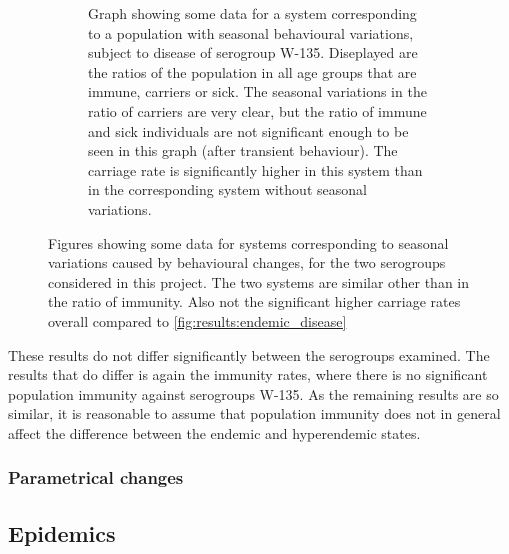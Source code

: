\documentclass[10pt,a4paper]{article}
\begin{document}
\begin{figure}
\begin{subfigure}{0.45\textwidth}
		\caption{Graph showing some data for a system corresponding to a population with seasonal behavioural variations, subject to disease of serogroup W-135. Diseplayed are the ratios of the population in all age groups that are immune, carriers or sick. The seasonal variations in the ratio of carriers are very clear, but the ratio of immune and sick individuals are not significant enough to be seen in this graph (after transient behaviour). The carriage rate is significantly higher in this system than in the corresponding system without seasonal variations.} \label{fig:results:seasonal_disease_W135}
	\end{subfigure}
	\caption{Figures showing some data for systems corresponding to seasonal variations caused by behavioural changes, for the two serogroups considered in this project. The two systems are similar other than in the ratio of immunity. Also not the significant higher carriage rates overall compared to \cref{fig:results:endemic_disease}} \label{fig:results:seasonal_disease}
\end{figure}

These results do not differ significantly between the serogroups examined. The results that do differ is again the immunity rates, where there is no significant population immunity against serogroups W-135. As the remaining results are so similar, it is reasonable to assume that population immunity does not in general affect the difference between the endemic and hyperendemic states.

\subsubsection{Parametrical changes}

\subsection{Epidemics}



\end{document}
